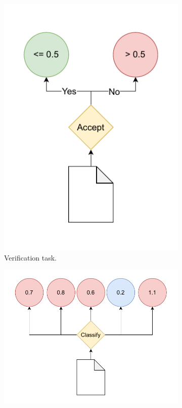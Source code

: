\begin{figure}[ht!]
    \begin{subfigure}[b]{0.35\textwidth}
        \centering
        \includegraphics[width=\textwidth]{images/verification.drawio.pdf}
        \caption{Verification task.}
        \label{fig:verification_example}
    \end{subfigure}
    \hfill
    \begin{subfigure}[b]{0.62\textwidth}
        \centering
        \includegraphics[width=\textwidth]{images/identification.drawio.pdf}

\end{subfigure}
\end{figure}
